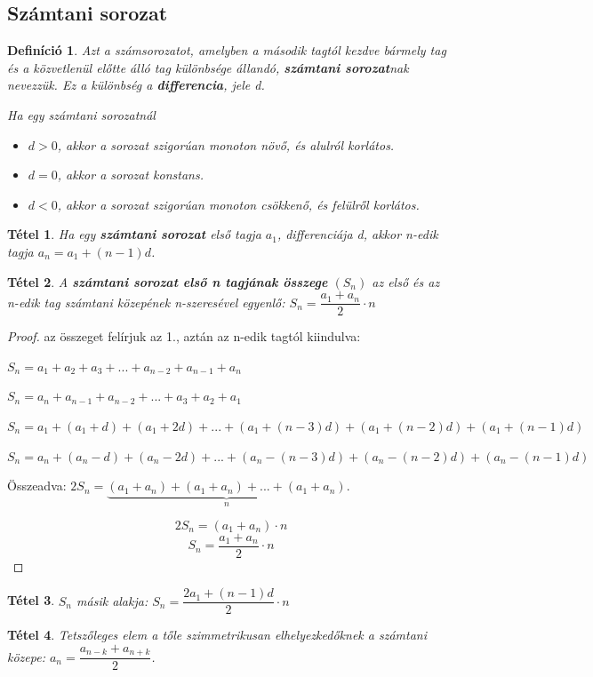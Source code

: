 \documentclass[12pt,a4paper]{article}
\newtheorem{theorem}{Tétel} [section]
\newtheorem{definition}{Definíció} [section]
\begin{document}
\subsection{Számtani sorozat}
\begin{definition}
Azt a számsorozatot, amelyben a második tagtól kezdve bármely tag és a közvetlenül előtte álló tag különbsége állandó, \textbf{számtani sorozat}nak nevezzük. Ez a különbség a \textbf{differencia}, jele d.

Ha egy számtani sorozatnál
\begin{itemize}
\item $d > 0$, akkor a sorozat szigorúan monoton növő, és alulról korlátos.
\item $d = 0$, akkor a sorozat konstans.
\item $d < 0$, akkor a sorozat szigorúan monoton csökkenő, és felülről korlátos.
\end{itemize}
\end{definition}

\begin{theorem}
 Ha egy \textbf{számtani sorozat} első tagja $a_1$, differenciája d, akkor n-edik tagja $a_n = a_1 + (n - 1)d$.
\end{theorem}

\begin{theorem}
A \textbf{számtani sorozat első n tagjának összege} $(S_n)$ az első és az n-edik tag számtani közepének n-szeresével egyenlő: $S_n=\dfrac{a_1+a_n}{2}\cdot n$
\end{theorem}
\begin{proof}
az összeget felírjuk az 1., aztán az n-edik tagtól kiindulva:

$S_n=a_1+a_2+a_3+...+a_{n-2}+a_{n-1}+a_n$

$S_n=a_n+a_{n-1}+a_{n-2}+...+a_3+a_2+a_1$

$S_n=a_1+(a_1+d)+(a_1+2d)+...+(a_1+(n-3)d)+(a_1+(n-2)d)+(a_1+(n-1)d)$

$S_n=a_n+(a_n-d)+(a_n-2d)+...+(a_n-(n-3)d)+(a_n-(n-2)d)+(a_n-(n-1)d)$

Összeadva:
$2S_n=\underbrace{(a_1+a_n)+(a_1+a_n)+...+(a_1+a_n)}_{n}$.

$$2S_n=(a_1+a_n)\cdot n$$
$$S_n=\dfrac{a_1+a_n}{2}\cdot n$$
\end{proof}

\begin{theorem}
$S_n$ másik alakja: $S_n=\dfrac{2a_1+(n-1)d}{2}\cdot n$
\end{theorem}

\begin{theorem}
Tetszőleges elem a tőle szimmetrikusan elhelyezkedőknek a számtani közepe: $a_n=\dfrac{a_{n-k}+a_{n+k}}{2}$.
\end{theorem}
\end{document}
